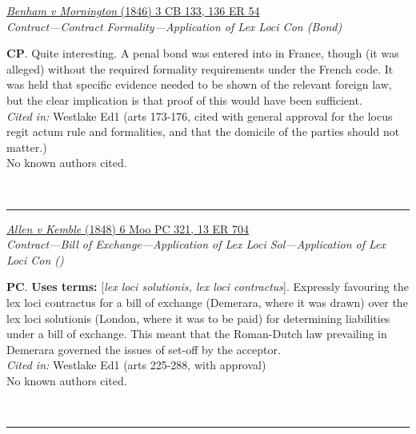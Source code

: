\documentclass[twoside]{article}
\begin{document}
        \begin{small}
        \begin{center}
        \href{https://heinonline.org/HOL/P?h=hein.engrep/engrg0136&i=58}{\textit{Benham v Mornington} (1846) 3 CB 133, 136 ER 54} \label{85} \\ 
\textit{Contract---Contract Formality---Application of Lex Loci Con (Bond)}\\
        \end{center}
        \textbf{CP}. Quite interesting. A penal bond was entered into in France, though (it was alleged) without the required formality requirements under the French code. It was held that specific evidence needed to be shown of the relevant foreign law, but the clear implication is that proof of this would have been sufficient.\\\textit{Cited in: }Westlake Ed1 (arts 173-176, cited with general approval for the locus regit actum rule and formalities, and that the domicile of the parties should not matter.)\\No known authors cited.
        \end{small}\\
        \rule{\textwidth}{0.5pt}
        

        \begin{small}
        \begin{center}
        \href{https://heinonline.org/HOL/P?h=hein.engrep/engrb0013&i=710}{\textit{Allen v Kemble} (1848) 6 Moo PC 321, 13 ER 704} \label{93} \\ 
\textit{Contract---Bill of Exchange---Application of Lex Loci Sol---Application of Lex Loci Con ()}\\
        \end{center}
        \textbf{PC}.  \textbf{Uses terms: }[\textit{lex loci solutionis, lex loci contractus}]. Expressly favouring the lex loci contractus for a bill of exchange (Demerara, where it was drawn) over the lex loci solutionis (London, where it was to be paid) for determining liabilities under a bill of exchange. This meant that the Roman-Dutch law prevailing in Demerara governed the issues of set-off by the acceptor.\\\textit{Cited in: }Westlake Ed1 (arts 225-288, with approval)\\No known authors cited.
        \end{small}\\
        \rule{\textwidth}{0.5pt}
        
\end{document}
